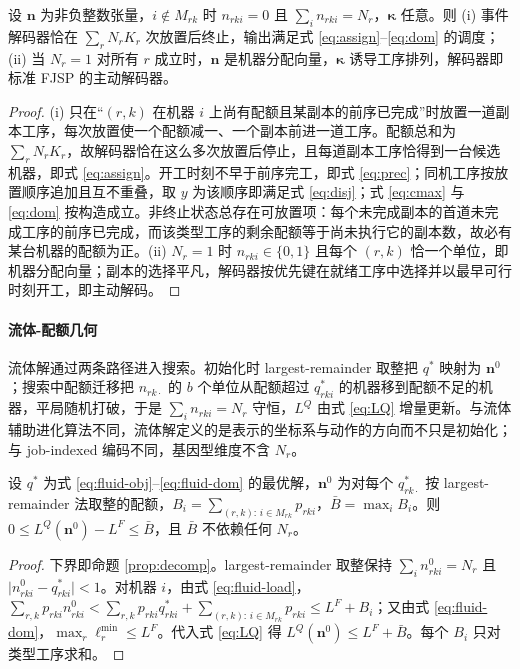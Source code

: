 \begin{theorem}[解码器正确性]\label{thm:decoder}
设 $\mathbf{n}$ 为非负整数张量，$i \notin M_{rk}$ 时 $n_{rki} = 0$ 且 $\sum_i n_{rki} = N_r$，$\boldsymbol{\kappa}$ 任意。则 (i) 事件解码器恰在 $\sum_r N_r K_r$ 次放置后终止，输出满足式 \eqref{eq:assign}--\eqref{eq:dom} 的调度；(ii) 当 $N_r = 1$ 对所有 $r$ 成立时，$\mathbf{n}$ 是机器分配向量，$\boldsymbol{\kappa}$ 诱导工序排列，解码器即标准 FJSP 的主动解码器。
\end{theorem}
\begin{proof}
(i) 只在“$(r,k)$ 在机器 $i$ 上尚有配额且某副本的前序已完成”时放置一道副本工序，每次放置使一个配额减一、一个副本前进一道工序。配额总和为 $\sum_r N_r K_r$，故解码器恰在这么多次放置后停止，且每道副本工序恰得到一台候选机器，即式 \eqref{eq:assign}。开工时刻不早于前序完工，即式 \eqref{eq:prec}；同机工序按放置顺序追加且互不重叠，取 $y$ 为该顺序即满足式 \eqref{eq:disj}；式 \eqref{eq:cmax} 与 \eqref{eq:dom} 按构造成立。非终止状态总存在可放置项：每个未完成副本的首道未完成工序的前序已完成，而该类型工序的剩余配额等于尚未执行它的副本数，故必有某台机器的配额为正。(ii) $N_r = 1$ 时 $n_{rki} \in \{0,1\}$ 且每个 $(r,k)$ 恰一个单位，即机器分配向量；副本的选择平凡，解码器按优先键在就绪工序中选择并以最早可行时刻开工，即主动解码。
\end{proof}

\paragraph{流体-配额几何} 流体解通过两条路径进入搜索。初始化时 largest-remainder 取整把 $q^*$ 映射为 $\mathbf{n}^0$；搜索中配额迁移把 $n_{rk\cdot}$ 的 $b$ 个单位从配额超过 $q^*_{rki}$ 的机器移到配额不足的机器，平局随机打破，于是 $\sum_i n_{rki} = N_r$ 守恒，$L^Q$ 由式 \eqref{eq:LQ} 增量更新。与流体辅助进化算法不同，流体解定义的是表示的坐标系与动作的方向而不只是初始化；与 job-indexed 编码不同，基因型维度不含 $N_r$。

\begin{proposition}[取整界]\label{prop:rounding}
设 $q^*$ 为式 \eqref{eq:fluid-obj}--\eqref{eq:fluid-dom} 的最优解，$\mathbf{n}^0$ 为对每个 $q^*_{rk\cdot}$ 按 largest-remainder 法取整的配额，$B_i = \sum_{(r,k):\, i \in M_{rk}} p_{rki}$，$\bar B = \max_i B_i$。则 $0 \le L^Q(\mathbf{n}^0) - L^F \le \bar B$，且 $\bar B$ 不依赖任何 $N_r$。
\end{proposition}
\begin{proof}
下界即命题 \ref{prop:decomp}。largest-remainder 取整保持 $\sum_i n^0_{rki} = N_r$ 且 $\lvert n^0_{rki} - q^*_{rki}\rvert < 1$。对机器 $i$，由式 \eqref{eq:fluid-load}，$\sum_{r,k} p_{rki} n^0_{rki} < \sum_{r,k} p_{rki} q^*_{rki} + \sum_{(r,k):\, i \in M_{rk}} p_{rki} \le L^F + B_i$；又由式 \eqref{eq:fluid-dom}，$\max_r \ell_r^{\min} \le L^F$。代入式 \eqref{eq:LQ} 得 $L^Q(\mathbf{n}^0) \le L^F + \bar B$。每个 $B_i$ 只对类型工序求和。
\end{proof}

